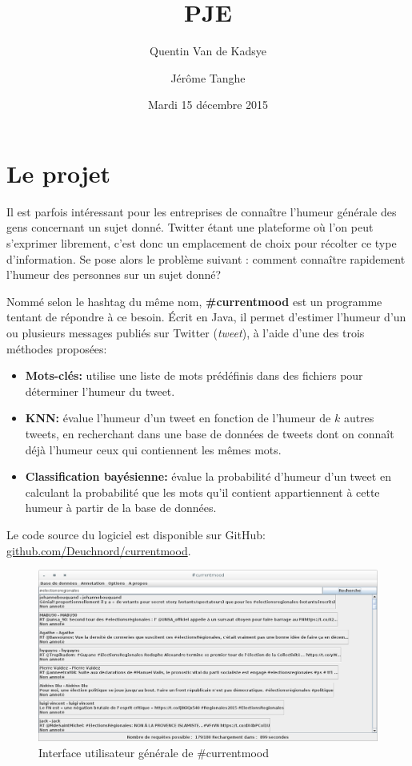 \documentclass[12pt,a4paper]{report}
\title{PJE\\\CMName}
\author{Quentin Van de Kadsye \and Jérôme Tanghe}
\date{Mardi 15 décembre 2015}
\newcommand{\CMName}{\#currentmood}
\begin{document}
\maketitle

\setcounter{tocdepth}{1}
\tableofcontents


\chapter{Le projet}

Il est parfois intéressant pour les entreprises de connaître l'humeur générale
des gens concernant un sujet donné. Twitter étant une plateforme où l'on peut
s'exprimer librement, c'est donc un emplacement de choix pour récolter ce type
d'information. Se pose alors le problème suivant : comment connaître rapidement
l'humeur des personnes sur un sujet donné?

Nommé selon le hashtag du même nom, \textbf{\CMName} est un programme tentant de
répondre à ce besoin. Écrit en Java, il permet d'estimer l'humeur d'un ou
plusieurs messages publiés sur Twitter (\textit{tweet}), à l'aide d'une des trois méthodes proposées:

\begin{itemize}
	\item
		\textbf{Mots-clés:} utilise une liste de mots prédéfinis dans des
		fichiers pour déterminer l'humeur du tweet.
	\item
		\textbf{KNN:} évalue l'humeur d'un tweet en fonction de l'humeur de $k$
		autres tweets, en recherchant dans une base de données de tweets dont on
		connaît déjà l'humeur ceux qui contiennent les mêmes mots.
	\item
		\textbf{Classification bayésienne:} évalue la probabilité d'humeur d'un
		tweet en calculant la probabilité que les mots qu'il contient
		appartiennent à cette humeur à partir de la base de données.
\end{itemize}

Le code source du logiciel est disponible sur GitHub:
\href{http://github.com/Deuchnord/currentmood}{github.com/Deuchnord/currentmood}.

\begin{figure}
	\includegraphics[width=\textwidth]{img/capture-currentmood-ui.png}
	\caption{Interface utilisateur générale de \CMName}
	\label{cm_ui}
\end{figure}
\end{document}
